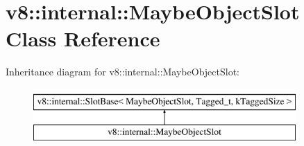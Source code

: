\hypertarget{classv8_1_1internal_1_1MaybeObjectSlot}{}\section{v8\+:\+:internal\+:\+:Maybe\+Object\+Slot Class Reference}
\label{classv8_1_1internal_1_1MaybeObjectSlot}
Inheritance diagram for v8\+:\+:internal\+:\+:Maybe\+Object\+Slot\+:\begin{figure}[H]
\begin{center}
\leavevmode
\includegraphics[height=2.000000cm]{classv8_1_1internal_1_1MaybeObjectSlot}
\end{center}
\end{figure}
